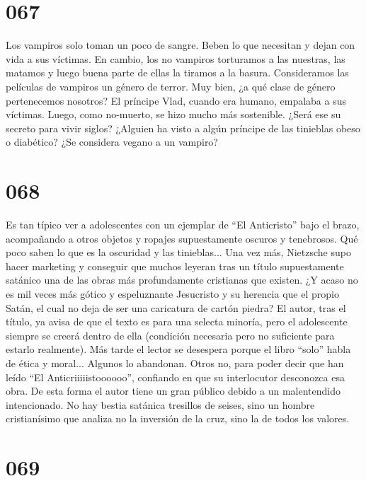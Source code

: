 \documentclass[a4paper,11pt,openright,twocolumn]{book}
\begin{document}
\section*{067}

Los vampiros solo toman un poco de sangre. Beben lo que necesitan y dejan con vida a sus víctimas. En cambio, los no vampiros torturamos a las nuestras, las matamos y luego buena parte de ellas la tiramos a la basura. Consideramos las películas de vampiros un género de terror. Muy bien, ¿a qué clase de género pertenecemos nosotros? El príncipe Vlad, cuando era humano, empalaba a sus víctimas. Luego, como no-muerto, se hizo mucho más sostenible. ¿Será ese su secreto para vivir siglos? ¿Alguien ha visto a algún príncipe de las tinieblas obeso o diabético? ¿Se considera vegano a un vampiro?

\section*{068}

Es tan típico ver a adolescentes con un ejemplar de ``El Anticristo'' bajo el brazo, acompañando a otros objetos y ropajes supuestamente oscuros y tenebrosos. Qué poco saben lo que es la oscuridad y las tinieblas... Una vez más, Nietzsche supo hacer marketing y conseguir que muchos leyeran tras un título supuestamente satánico una de las obras más profundamente cristianas que existen. ¿Y acaso no es mil veces más gótico y espeluznante Jesucristo y su herencia que el propio Satán, el cual no deja de ser una caricatura de cartón piedra? El autor, tras el título, ya avisa de que el texto es para una selecta minoría, pero el adolescente siempre se creerá dentro de ella (condición necesaria pero no suficiente para estarlo realmente). Más tarde el lector se desespera porque el libro ``solo'' habla de ética y moral... Algunos lo abandonan. Otros no, para poder decir que han leído ``El Anticriiiiistoooooo'', confiando en que su interlocutor desconozca esa obra. De esta forma el autor tiene un gran público debido a un malentendido intencionado. No hay bestia satánica tresillos de seises, sino un hombre cristianísimo que analiza no la inversión de la cruz, sino la de todos los valores. 

\section*{069}
\end{document}
